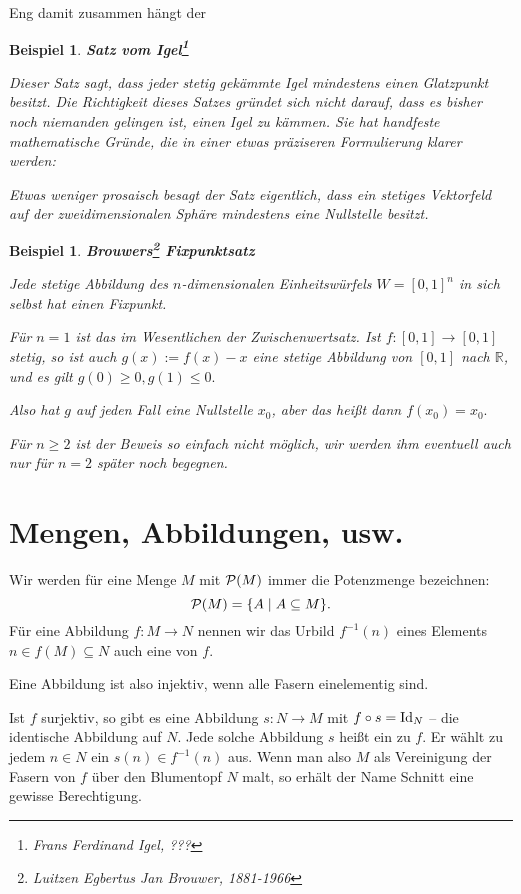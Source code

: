\documentclass[12pt]{book}   %
\newtheorem{bsp}[alles]{Beispiel}
\begin{document}
Eng damit zusammen h\"angt der

\begin{bsp} {\bf Satz vom Igel\footnote{Frans Ferdinand Igel, ???}}

{\rm Dieser Satz sagt, dass jeder stetig gek\"ammte Igel mindestens einen 
Glatzpunkt besitzt. Die Richtigkeit dieses Satzes gr\"undet sich nicht darauf, 
dass es bisher noch niemanden gelingen ist, einen Igel zu k\"ammen. Sie hat
handfeste mathematische Gr\"unde, die in einer etwas pr\"aziseren Formulierung 
klarer werden:

Etwas weniger prosaisch besagt der Satz \glqq eigentlich\grqq, dass ein 
stetiges Vektorfeld auf der zweidimensionalen Sph\"are mindestens eine
Nullstelle besitzt.
}
\end{bsp}

\begin{bsp} {\bf Brouwers\footnote{Luitzen Egbertus Jan Brouwer, 1881-1966}
Fixpunktsatz}

{\rm Jede stetige Abbildung des $n$-dimensionalen Einheitsw\"urfels 
$W=[0,1]^n$ in sich selbst hat einen Fixpunkt.

F\"ur $n=1$ ist das im Wesentlichen der Zwischenwertsatz. Ist $f:[0,1]
\longrightarrow [0,1]$ stetig, so ist auch $g(x) := f(x)-x$ eine stetige 
Abbildung von $[0,1]$ nach $\mathbb R$, und es gilt $g(0)\geq 0, g(1)\leq 0.$

Also hat $g$ auf jeden Fall eine Nullstelle $x_0$, aber das hei\ss t dann 
$f(x_0) = x_0.$

F\"ur $n\geq 2$ ist der Beweis so einfach nicht m\"oglich, wir werden ihm 
eventuell auch nur f\"ur $n=2$ sp\"ater noch begegnen.
}
\end{bsp}

\section{Mengen, Abbildungen, usw.}

Wir werden f\"ur eine Menge $M$ mit ${\cal P}(M)$ immer die Potenzmenge 
bezeichnen: 
$${\cal P}(M) = \{A \mid A\subseteq M\}.$$
F\"ur eine Abbildung $f:M\longrightarrow N$ nennen wir das Urbild
$f^{-1}(n)$ eines Elements $n\in f(M)\subseteq N$ auch eine 
 von $f.$

Eine Abbildung ist also injektiv, wenn alle Fasern  einelementig sind.

Ist $f$ surjektiv, so gibt es eine Abbildung $s:N\longrightarrow M$ mit
$f\circ s = {\rm Id}_N$ -- die identische Abbildung auf $N.$ Jede solche 
Abbildung $s$ hei\ss t ein  zu $f$. Er w\"ahlt zu 
jedem $n\in N$ ein $s(n)\in f^{-1}(n)$ aus. Wenn man also $M$ als Vereinigung
der Fasern von $f$ \"uber den Blumentopf $N$ malt, so erh\"alt der Name Schnitt
eine gewisse Berechtigung.
\end{document}
